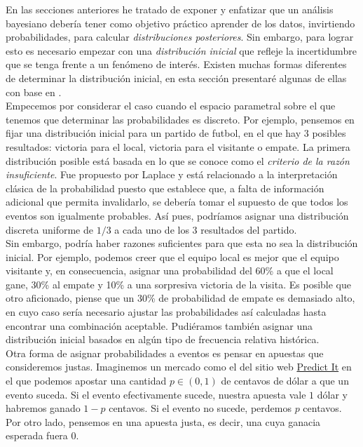 En las secciones anteriores he tratado de exponer y enfatizar que un análisis bayesiano debería tener como objetivo práctico aprender de los datos, invirtiendo probabilidades, para calcular \textit{distribuciones posteriores}. Sin embargo, para lograr esto es necesario empezar con una \textit{distribución inicial} que refleje la incertidumbre que se tenga frente a un fenómeno de interés. Existen muchas formas diferentes de determinar la distribución inicial, en esta sección presentaré algunas de ellas con base en \textcites{Berger85,Congdon06,Robert07,Gelman13}.\\ 

Empecemos por considerar el caso cuando el espacio parametral sobre el que tenemos que determinar las probabilidades es discreto. Por ejemplo, pensemos en fijar una distribución inicial para un partido de futbol, en el que hay 3 posibles resultados: victoria para el local, victoria para el visitante o empate. La primera distribución posible está basada en lo que se conoce como el \textit{criterio de la razón insuficiente}. Fue propuesto por Laplace y está relacionado a la interpretación clásica de la probabilidad puesto que establece que, a falta de información adicional que permita invalidarlo, se debería tomar el supuesto de que todos los eventos son igualmente probables. Así pues, podríamos asignar una distribución discreta uniforme de $1/3$ a cada uno de los 3 resultados del partido.\\

Sin embargo, podría haber razones suficientes para que esta no sea la distribución inicial. Por ejemplo, podemos creer que el equipo local es mejor que el equipo visitante y, en consecuencia, asignar una probabilidad del  60\% a que el local gane, 30\% al empate y 10\% a una sorpresiva victoria de la visita. Es posible que otro aficionado, piense que un 30\% de probabilidad de empate es demasiado alto, en cuyo caso sería necesario ajustar las probabilidades así calculadas hasta encontrar una combinación aceptable. Pudiéramos también asignar una distribución inicial basados en algún tipo de frecuencia relativa histórica.\\ 

Otra forma de asignar probabilidades a eventos es pensar en apuestas que consideremos justas. Imaginemos un mercado como el del sitio web 	\href{https://www.predictit.org/}{Predict It} en el que podemos apostar una cantidad $p \in (0,1)$ de centavos de dólar a que un evento suceda. Si el evento efectivamente sucede, nuestra apuesta vale $1$ dólar y habremos ganado $1-p$ centavos. Si el evento no sucede, perdemos $p$ centavos. Por otro lado, pensemos en una apuesta justa, es decir, una cuya ganacia esperada fuera $0$.\\ 

